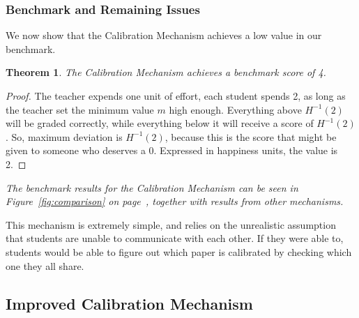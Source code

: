\documentclass[12pt, Arial]{article}
\newtheorem{theorem}{Theorem}
\begin{document}
\subsubsection{Benchmark and Remaining Issues}
We now show that the Calibration Mechanism achieves a low value in our benchmark.
\begin{theorem}
The Calibration Mechanism achieves a benchmark score of 4.
\end{theorem}
\begin{proof}
The teacher expends one unit of effort, each student spends 2, as long as the teacher set the minimum value $m$ high enough.
Everything above $H^{-1}(2)$ will be graded correctly, while everything below it will receive a score of $H^{-1}(2)$.
So, maximum deviation is $H^{-1}(2)$, because this is the score that might be given to someone who deserves a 0. Expressed in happiness units, the value is 2.
\end{proof}

\emph{The benchmark results for the Calibration Mechanism can be seen in Figure~\ref{fig:comparison} on page~\pageref{fig:comparison}, together with results from other mechanisms.}

This mechanism is extremely simple, and relies on the unrealistic assumption that students are unable to communicate with each other. If they were able to, students would be able to figure out which paper is calibrated by checking which one they all share.
\subsection{Improved Calibration Mechanism}
\end{document}
